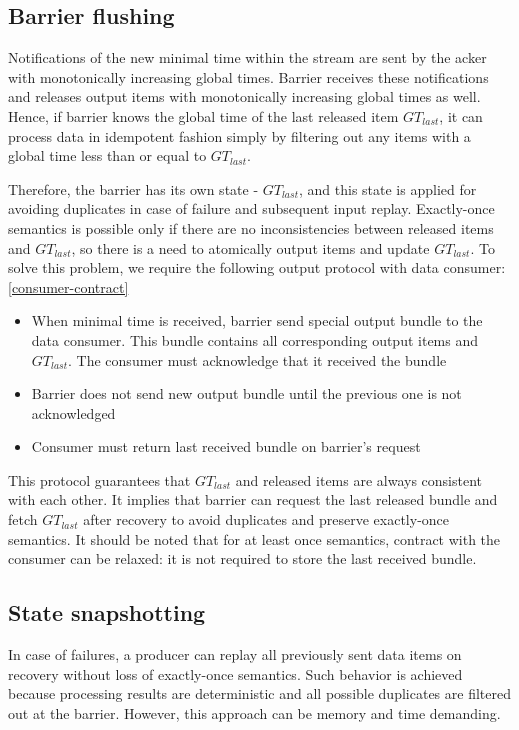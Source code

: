 \subsection{Barrier flushing}
Notifications of the new minimal time within the stream are sent by the acker with monotonically increasing global times. Barrier receives these notifications and releases output items with monotonically increasing global times as well. Hence, if barrier knows the global time of the last released item $GT_{last}$, it can process data in idempotent fashion simply by filtering out any items with a global time less than or equal to $GT_{last}$. 

Therefore, the barrier has its own state - $GT_{last}$, and this state is applied for avoiding duplicates in case of failure and subsequent input replay. Exactly-once semantics is possible only if there are no inconsistencies between released items and $GT_{last}$, so there is a need to atomically output items and update $GT_{last}$. To solve this problem, we require the following output protocol with data consumer: \ref{consumer-contract}

\begin{itemize}
    \item When minimal time is received, barrier send special output bundle to the data consumer. This bundle contains all corresponding output items and $GT_{last}$. The consumer must acknowledge that it received the bundle
    \item Barrier does not send new output bundle until the previous one is not acknowledged
    \item Consumer must return last received bundle on barrier's request 
\end{itemize}

This protocol guarantees that $GT_{last}$ and released items are always consistent with each other. It implies that barrier can request the last released bundle and fetch $GT_{last}$ after recovery to avoid duplicates and preserve exactly-once semantics. It should be noted that for at least once semantics, contract with the consumer can be relaxed: it is not required to store the last received bundle.

\subsection{State snapshotting}
In case of failures, a producer can replay all previously sent data items on recovery without loss of exactly-once semantics. Such behavior is achieved because processing results are deterministic and all possible duplicates are filtered out at the barrier. However, this approach can be memory and time demanding. 

